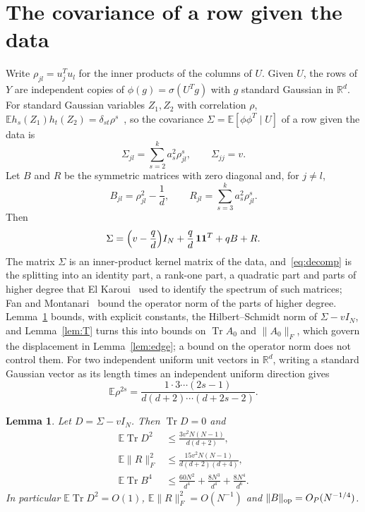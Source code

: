 \documentclass[11pt]{amsart}
\newtheorem{lemma}[theorem]{Lemma}
\theoremstyle{remark}
\numberwithin{equation}{section}
\newcommand{\EE}{\mathbb{E}}
\newcommand{\RR}{\mathbb{R}}
\DeclareMathOperator{\Tr}{Tr}
\begin{document}
\section{The covariance of a row given the data}\label{sec:cov}
Write $\rho_{jl}=u_j^{T}u_l$ for the inner products of the columns of $U$. Given $U$, the rows of $Y$ are independent copies of $\phi(g)=\sigma(U^{T}g)$ with $g$ standard Gaussian in $\RR^{d}$. For standard Gaussian variables $Z_1,Z_2$ with correlation $\rho$, $\EE h_s(Z_1)h_t(Z_2)=\delta_{st}\rho^{s}$~\cite[Section~11.2]{ODonnell}, so the covariance $\Sigma=\EE[\phi\phi^{T}\mid U]$ of a row given the data is
\begin{equation}\label{eq:Sigma}
\Sigma_{jl}=\sum_{s=2}^{k}a_s^2\rho_{jl}^{s},\qquad\Sigma_{jj}=v.
\end{equation}
Let $B$ and $R$ be the symmetric matrices with zero diagonal and, for $j\ne l$,
\[
B_{jl}=\rho_{jl}^2-\frac1d,\qquad R_{jl}=\sum_{s=3}^{k}a_s^2\rho_{jl}^{s}.
\]
Then
\begin{equation}\label{eq:decomp}
\Sigma=\Bigl(v-\frac qd\Bigr)I_N+\frac qd\,\mathbf 1\mathbf 1^{T}+qB+R.
\end{equation}
The matrix $\Sigma$ is an inner-product kernel matrix of the data, and~\eqref{eq:decomp} is the splitting into an identity part, a rank-one part, a quadratic part and parts of higher degree that El Karoui~\cite{EK10} used to identify the spectrum of such matrices; Fan and Montanari~\cite{FM} bound the operator norm of the parts of higher degree. Lemma~\ref{lem:cov} bounds, with explicit constants, the Hilbert--Schmidt norm of $\Sigma-vI_N$, and Lemma~\ref{lem:T} turns this into bounds on $\Tr A_0$ and $\|A_0\|_F$, which govern the displacement in Lemma~\ref{lem:edge}; a bound on the operator norm does not control them.
For two independent uniform unit vectors in $\RR^{d}$, writing a standard Gaussian vector as its length times an independent uniform direction gives
\begin{equation}\label{eq:sphmom}
\EE\rho^{2s}=\frac{1\cdot3\cdots(2s-1)}{d(d+2)\cdots(d+2s-2)}.
\end{equation}

\begin{lemma}\label{lem:cov}
Let $D=\Sigma-vI_N$. Then $\Tr D=0$ and
\begin{align}
\EE\Tr D^2&\le\frac{3v^2N(N-1)}{d(d+2)},\label{eq:D2}\\
\EE\|R\|_F^2&\le\frac{15v^2N(N-1)}{d(d+2)(d+4)},\label{eq:R2}\\
\EE\Tr B^4&\le\frac{60N^2}{d^4}+\frac{8N^3}{d^4}+\frac{8N^4}{d^6}.\label{eq:B4}
\end{align}
In particular $\EE\Tr D^2=O(1)$, $\EE\|R\|_F^2=O(N^{-1})$ and $\|B\|_{\rm op}=O_P(N^{-1/4})$.
\end{lemma}
\end{document}
